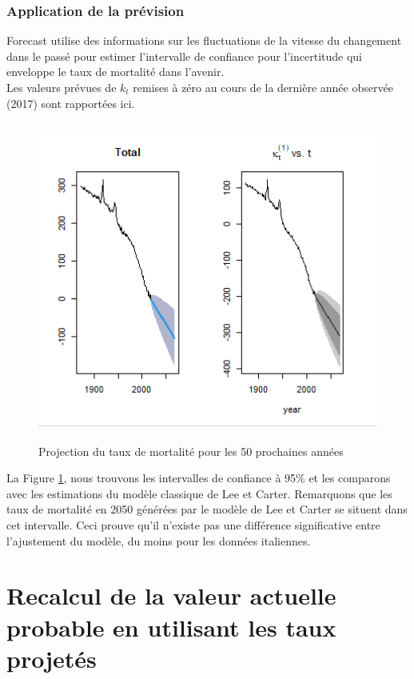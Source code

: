 \documentclass[french]{report}
\begin{document}
\subsubsection{Application de la prévision}

Forecast utilise des informations sur les fluctuations de la vitesse du changement dans le passé pour estimer
l'intervalle de confiance pour l'incertitude qui enveloppe le taux de mortalité dans l'avenir.\\ 
\newpage
Les valeurs prévues de ${k_{t}}$ remises à zéro au cours de la dernière année observée (2017) sont rapportées ici.\\
\begin{figure}[hhhhhhhh!]
    \centering
    \includegraphics[width=14cm, height=10.5cm]{projection_forecast.png}
    \caption{ Projection du taux de mortalité pour les 50 prochaines années }
    \label{fig:prediction1.png}
\end{figure}

La Figure \ref{fig:prediction1.png}, nous trouvons les intervalles de confiance à 95\% et les comparons avec les estimations du modèle classique
de Lee et Carter. Remarquons que les
taux de mortalité en 2050 générées par le modèle de Lee et Carter se situent dans cet intervalle. Ceci prouve qu’il n'existe pas une différence significative
entre l’ajustement du modèle, du moins pour les données italiennes.

\section{Recalcul de la valeur actuelle probable en utilisant les taux projetés }
\end{document}
